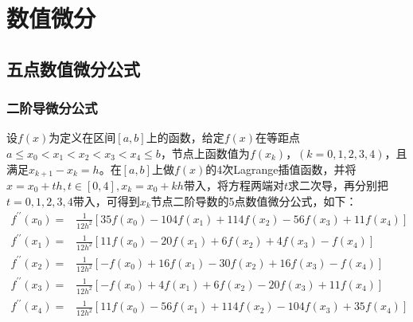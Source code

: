 \chapter{数值微分}
\section{五点数值微分公式}
\subsection{二阶导微分公式}
设$f(x)$为定义在区间$[a,b]$上的函数，给定$f(x)$在等距点$a \leqslant x_0 < x_1 < x_2 < x_3 < x_4 \leqslant b$，节点上函数值为$f(x_k)$，$(k=0, 1, 2, 3, 4)$，且满足$x_{k+1}-x_k=h$。在$[a,b]$上做$f(x)$的4次Lagrange插值函数，并将$x=x_0+th, t \in [0, 4], x_k = x_0+kh$带入，将方程两端对$t$求二次导，再分别把$t=0, 1, 2, 3, 4$带入，可得到$x_k$节点二阶导数的5点数值微分公式，如下：
\begin{equation}
	\begin{aligned}
		f^{\prime\prime}(x_0) =& \frac{1}{12h^2}[35f(x_0) - 104f(x_1) + 114f(x_2) - 56f(x_3) + 11f(x_4)]	\\
		f^{\prime\prime}(x_1) =& \frac{1}{12h^2}[11f(x_0) -  20f(x_1) +   6f(x_2) +  4f(x_3) -   f(x_4)]	\\
		f^{\prime\prime}(x_2) =& \frac{1}{12h^2}[ -f(x_0) +  16f(x_1) -  30f(x_2) + 16f(x_3) -   f(x_4)]	\\
		f^{\prime\prime}(x_3) =& \frac{1}{12h^2}[ -f(x_0) +   4f(x_1) +   6f(x_2) - 20f(x_3) + 11f(x_4)]	\\
		f^{\prime\prime}(x_4) =& \frac{1}{12h^2}[11f(x_0) -  56f(x_1) + 114f(x_2) -104f(x_3) + 35f(x_4)]
	\end{aligned}
\end{equation} 
	




